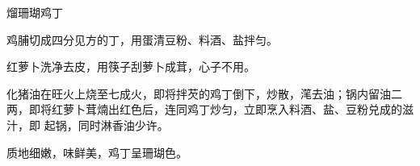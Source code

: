 %
%
%
%
%
%
%
\begin{recipe}{熘珊瑚鸡丁}

\ingredients


\preparation

\step 鸡脯切成四分见方的丁，用蛋清豆粉、料酒、盐拌匀。

\step 红萝卜洗净去皮，用筷子刮萝卜成茸，心子不用。

\step 化猪油在旺火上烧至七成火，即将拌芡的鸡丁倒下，炒散，滗去油；锅内留油二
两，即将红萝卜茸煵出红色后，连同鸡丁炒匀，立即烹入料酒、盐、豆粉兑成的滋汁，即
起锅，同时淋香油少许。

\features

质地细嫩，味鲜美，鸡丁呈珊瑚色。

\end{recipe}

